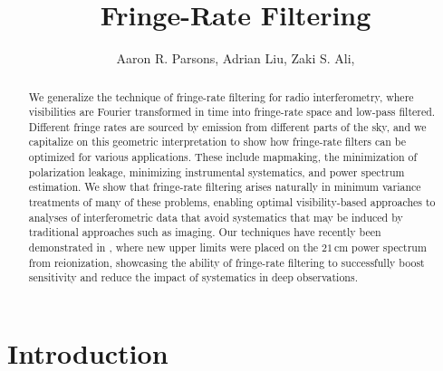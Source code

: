 \documentclass[twocolumn,apj,numberedappendix]{emulateapj}
\begin{document}
\title{Fringe-Rate Filtering}

\author{
Aaron R. Parsons,
Adrian Liu,
Zaki S. Ali,
}


\begin{abstract}
We generalize the technique of fringe-rate filtering for radio interferometry, where visibilities 
are Fourier transformed in time into fringe-rate space and low-pass filtered. Different fringe rates
are sourced by emission from different parts of the sky, and we capitalize on this geometric
interpretation to show how fringe-rate filters can be optimized for various applications.
These
include mapmaking, the minimization of polarization leakage, minimizing instrumental systematics,
and power spectrum estimation. We show that fringe-rate filtering arises naturally in minimum variance
treatments of many of these problems, enabling optimal visibility-based approaches to analyses of
interferometric data that avoid systematics that may be induced by traditional approaches such as imaging. Our techniques have
recently been demonstrated in \citet{ali_et_al2015}, where new upper limits
were placed on the $21\,\textrm{cm}$ power spectrum from reionization, showcasing the ability
of fringe-rate filtering to successfully boost sensitivity and reduce the impact of systematics in
deep observations.
\end{abstract}




\section{Introduction}
\end{document}
